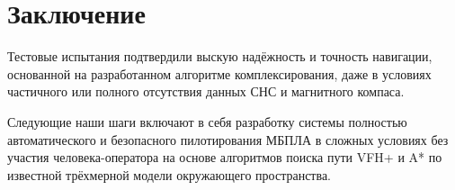 \documentclass[12pt,a4paper]{article}
\begin{document}
\section{Заключение}

Тестовые испытания подтвердили выскую надёжность и точность навигации, основанной на разработанном алгоритме комплексирования, даже в условиях частичного или полного отсутствия данных СНС и магнитного компаса.

Следующие наши шаги включают в себя разработку системы полностью автоматического и безопасного пилотирования МБПЛА в сложных условиях без участия человека-оператора на основе алгоритмов поиска пути VFH+ и A* по известной трёхмерной модели окружающего пространства.

\nocite{*}
\newpage
\begin{fullwidth}
\printbibliography
\end{fullwidth}
\end{document}
